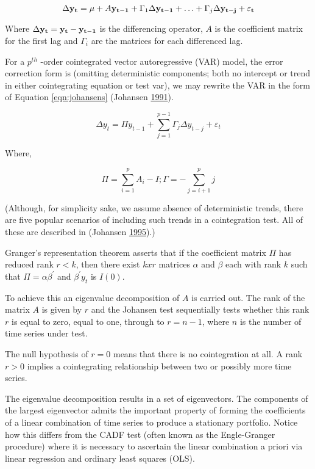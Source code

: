 \documentclass[
  12pt,
]{article}
\begin{document}
\begin{equation}
\label{eqn:vecm-differenced}
\Delta {\bf y_t} = {\bf \mu} + A {\bf y_{t-1}} + \Gamma_1 \Delta {\bf y_{t-1}} + \ldots + \Gamma_j \Delta {\bf y_{t-j}} + {\bf \varepsilon_t} 
\end{equation}

Where \(\Delta {\bf y_t} = {\bf y_t} - {\bf y_{t-1}}\) is the differencing operator, \(A\) is the coefficient matrix for the first lag and \(\Gamma_i\) are the matrices for each differenced lag.

For a \(p^{th}\) -order cointegrated vector autoregressive (VAR) model, the error correction form is (omitting deterministic components; both no intercept or trend in either cointegrating equation or test var), we may rewrite the VAR in the form of Equation \ref{eqn:johansens} (Johansen \protect\hyperlink{ref-johansen1991estimation}{1991}).

\begin{equation}
\label{eqn:johansens}
\Delta y_t = \Pi y_{t-1} + \sum_{j = 1}^{p-1} {\Gamma_j \Delta y_{t-j}} + \varepsilon_t
\end{equation}

Where,

\[
\Pi = \sum^{p}_{i = 1}{A_{i}-I}; \Gamma = -\sum^{p}_{j = i + 1}{j}
\]

(Although, for simplicity sake, we assume absence of deterministic trends, there are five popular scenarios of including such trends in a cointegration test. All of these are described in (Johansen \protect\hyperlink{ref-johansen1995identifying}{1995}).)

Granger's representation theorem asserts that if the coefficient matrix \(\Pi\) has reduced rank \(r < k\), then there exist \(kxr\) matrices \(\alpha\) and \(\beta\) each with rank \(k\) such that \(\Pi = \alpha \beta^{\prime}\) and \(\beta^{\prime}y_t\) is \(I(0)\).

To achieve this an eigenvalue decomposition of \(A\) is carried out. The rank of the matrix \(A\) is given by \(r\) and the Johansen test sequentially tests whether this rank \(r\) is equal to zero, equal to one, through to \(r=n-1\), where \(n\) is the number of time series under test.

The null hypothesis of \(r=0\) means that there is no cointegration at all. A rank \(r > 0\) implies a cointegrating relationship between two or possibly more time series.

The eigenvalue decomposition results in a set of eigenvectors. The components of the largest eigenvector admits the important property of forming the coefficients of a linear combination of time series to produce a stationary portfolio. Notice how this differs from the CADF test (often known as the Engle-Granger procedure) where it is necessary to ascertain the linear combination a priori via linear regression and ordinary least squares (OLS).
\end{document}
